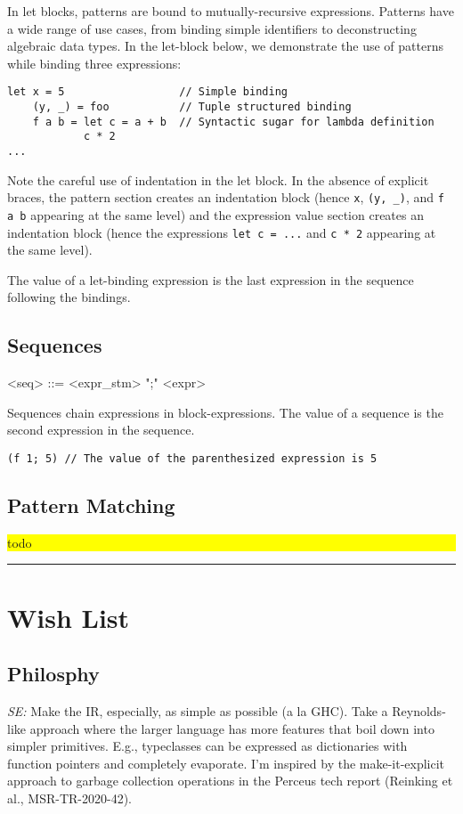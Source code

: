 \documentclass{article}
\newcommand{\fixme}[1]{
  \noindent\colorbox{yellow}{\parbox{\dimexpr\linewidth-2\fboxsep}{#1}}%
}
\begin{document}
In let blocks, patterns are bound to mutually-recursive expressions. Patterns have a wide range of use cases, from binding simple identifiers to deconstructing algebraic data types. In the let-block below, we demonstrate the use of patterns while binding three expressions:
\begin{lstlisting}
let x = 5                  // Simple binding
    (y, _) = foo           // Tuple structured binding
    f a b = let c = a + b  // Syntactic sugar for lambda definition
            c * 2
...
\end{lstlisting}
Note the careful use of indentation in the let block. In the absence of explicit braces, the pattern section creates an indentation block (hence \texttt{x}, \texttt{(y, _)}, and \texttt{f a b} appearing at the same level) and the expression value section creates an indentation block (hence the expressions \texttt{let c = ...} and \texttt{c * 2} appearing at the same level).

The value of a let-binding expression is the last expression in the sequence following the bindings.
\subsection{Sequences}
\begin{grammar}
<seq> ::= <expr_stm> ";" <expr>
\end{grammar}
Sequences chain expressions in block-expressions. The value of a sequence is the second expression in the sequence.
\begin{lstlisting}
(f 1; 5) // The value of the parenthesized expression is 5
\end{lstlisting}


\subsection{Pattern Matching}
\fixme{todo}

\newpage

\hrule

\section{Wish List}

\subsection{Philosphy}

\textit{SE:} Make the IR, especially, as simple as possible (a la
GHC). Take a Reynolds-like approach where the larger language has more
features that boil down into simpler primitives.  E.g., typeclasses
can be expressed as dictionaries with function pointers and completely
evaporate.  I'm inspired by the make-it-explicit approach to garbage
collection operations in the Perceus tech report (Reinking et al.,
MSR-TR-2020-42).
\end{document}
